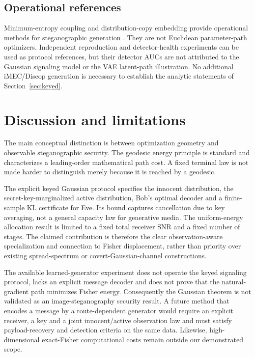 \documentclass[preprint,12pt]{elsarticle}
\begin{document}
\subsection{Operational references}
Minimum-entropy coupling and
distribution-copy embedding provide
operational methods for steganographic
generation \cite{schroeder2023,ding2023}.
They are not Euclidean parameter-path
optimizers. Independent reproduction
and detector-health experiments can be
used as protocol references, but their
detector AUCs are not attributed to the
Gaussian signaling model or the
VAE latent-path illustration.
No additional iMEC/Discop generation
is necessary to establish the analytic
statements of Section~\ref{sec:keyed}.


\section{Discussion and limitations}
The main conceptual distinction is between
optimization geometry and observable
steganographic security. The geodesic
energy principle is standard and
characterizes a leading-order mathematical
path cost. A fixed terminal law is
not made harder to distinguish merely
because it is reached by a geodesic.


The explicit keyed Gaussian protocol
specifies the innocent distribution,
the secret-key-marginalized active
distribution, Bob's optimal decoder and
a finite-sample KL certificate for Eve.
Its bound captures cancellation due to
key averaging, not a general capacity
law for generative media. The
uniform-energy allocation result is
limited to a fixed total receiver SNR
and a fixed number of stages.
The claimed contribution is therefore
the clear observation-aware
specialization and connection to
Fisher displacement, rather than
priority over existing spread-spectrum
or covert-Gaussian-channel constructions.


The available learned-generator
experiment does not operate the
keyed signaling protocol, lacks an
explicit message decoder and does not
prove that the natural-gradient path
minimizes Fisher energy. Consequently
the Gaussian theorem is not validated
as an image-steganography security
result. A future method that encodes
a message by a route-dependent generator
would require an explicit receiver,
a key and a joint innocent/active
observation law and must satisfy
payload-recovery and detection
criteria on the same data. Likewise,
high-dimensional exact-Fisher
computational costs remain outside
our demonstrated scope.
\end{document}
